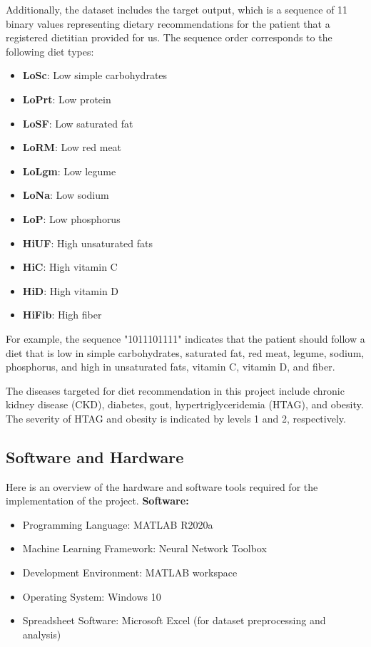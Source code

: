 Additionally, the dataset includes the target output, which is a sequence of 11 binary values representing dietary recommendations for the patient that a registered dietitian provided for us. The sequence order corresponds to the following diet types:
\begin{itemize}
    \item \textbf{LoSc}: Low simple carbohydrates
    \item \textbf{LoPrt}: Low protein
    \item \textbf{LoSF}: Low saturated fat
    \item \textbf{LoRM}: Low red meat
    \item \textbf{LoLgm}: Low legume
    \item \textbf{LoNa}: Low sodium
    \item \textbf{LoP}: Low phosphorus
    \item \textbf{HiUF}: High unsaturated fats
    \item \textbf{HiC}: High vitamin C
    \item \textbf{HiD}: High vitamin D
    \item \textbf{HiFib}: High fiber
\end{itemize}
For example, the sequence "1011101111" indicates that the patient should follow a diet that is low in simple carbohydrates, saturated fat, red meat, legume, sodium, phosphorus, and high in unsaturated fats, vitamin C, vitamin D, and fiber.

The diseases targeted for diet recommendation in this project include chronic kidney disease (CKD), diabetes, gout, hypertriglyceridemia (HTAG), and obesity. The severity of HTAG and obesity is indicated by levels 1 and 2, respectively. 

\subsection{Software and Hardware}
Here is an overview of the hardware and software tools required for the implementation of the project.
\newline\newline\textbf{Software:}
\begin{itemize}
    \item Programming Language: MATLAB R2020a
    \item Machine Learning Framework: Neural Network Toolbox
    \item Development Environment: MATLAB workspace
    \item Operating System: Windows 10
    \item Spreadsheet Software: Microsoft Excel (for dataset preprocessing and analysis)
\end{itemize}

